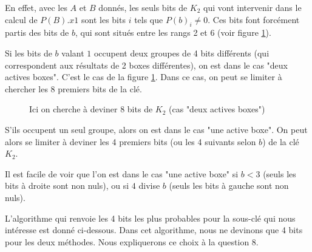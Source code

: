En effet, avec les $A$ et $B$ donnés, les seuls bits de $K_2$ qui vont intervenir dans le calcul de $P(B).x1$ sont les bits $i$ tels que $P(b)_i \neq 0$. Ces bits font forcément partis des bits de $b$, qui sont situés entre les rangs 2 et 6 (voir figure 
\ref{illustration_bits_key}).

Si les bits de $b$ valant $1$ occupent deux groupes de 4 bits différents (qui correspondent aux résultats de 2 boxes différentes), on est dans le cas "deux actives boxes". C'est le cas de la figure \ref{illustration_bits_key}. Dans ce cas, on peut se limiter à chercher les 8 premiers bits de la clé.


\begin{figure}[!ht]
\centering
{}
\caption{Ici on cherche à deviner 8 bits de $K_2$ (cas "deux actives boxes")}
\label{illustration_bits_key}
\end{figure}


S'ils occupent un seul groupe, alors on est dans le cas "une active boxe". On peut alors se limiter à deviner les 4 premiers bits (ou les 4 suivants selon $b$) de la clé $K_2$.

Il est facile de voir que l'on est dans le cas "une active boxe" si $b < 3$ (seuls les bits à droite sont non nuls), ou si $4$ divise $b$ (seuls les bits à gauche sont non nuls).

L'algorithme qui renvoie les 4 bits les plus probables pour la sous-clé qui nous intéresse est donné ci-dessous. Dans cet algorithme, nous ne devinons que 4 bits pour les deux méthodes. Nous expliquerons ce choix à la question 8.

